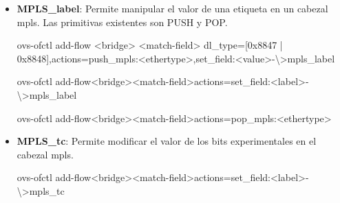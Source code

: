 \begin{itemize}
\item \textbf{MPLS\_label}: Permite manipular el valor de una etiqueta en un cabezal mpls. Las primitivas existentes son PUSH y POP.

\begin{center}
ovs-ofctl add-flow <bridge> <match-field> dl\_type=[0x8847 | 0x8848],actions=push\_mpls:<ethertype>,set\_field:<value>-\textbackslash >mpls\_label
\end{center}

\begin{center}
ovs-ofctl add-flow<bridge><match-field>actions=set\_field:<label>-\textbackslash >mpls\_label
\end{center}

\begin{center}
ovs-ofctl add-flow<bridge><match-field>actions=pop\_mpls:<ethertype>
\end{center}

\item \textbf{MPLS\_tc}: Permite modificar el valor de los bits experimentales en el cabezal mpls.

\begin{center}
ovs-ofctl add-flow<bridge><match-field>actions=set\_field:<label>-\textbackslash >mpls\_tc
\end{center}

\end{itemize}
